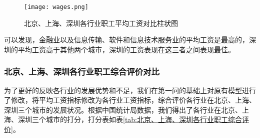 \documentclass[withoutpreface,bwprint]{cumcmthesis} %
\newcommand{\upcite}[1]{\textsuperscript{\textsuperscript{\cite{#1}}}}
\begin{document}
	


\begin{figure}[!h]
\centering
\texttt{[image: wages.png]}
\caption{北京、上海、深圳各行业职工平均工资对比柱状图
}
\label{tab:北京、上海、深圳各行业职工平均工资对比柱状图
}
\end{figure}

可以发现，金融业以及信息传输、软件和信息技术服务业的平均工资是最高的，深圳的平均工资高于其他两个城市，深圳的工资表现在这三者之间表现最佳。
\subsubsection{北京、上海、深圳各行业职工综合评价对比}
为了更好的反映各行业的发展优势和不足，我们在第一问的基础上对原有模型进行了修改，将平均工资指标修改为各行业工资指标，综合评价各行业在北京、上海、深圳三个城市的发展状况。根据中国统计局数据\upcite{bib:2}，我们得出了各行业在北京、上海、深圳三个城市的打分，打分表如表\ref{tab:北京、上海、深圳各行业职工综合评价}。
\end{document}
